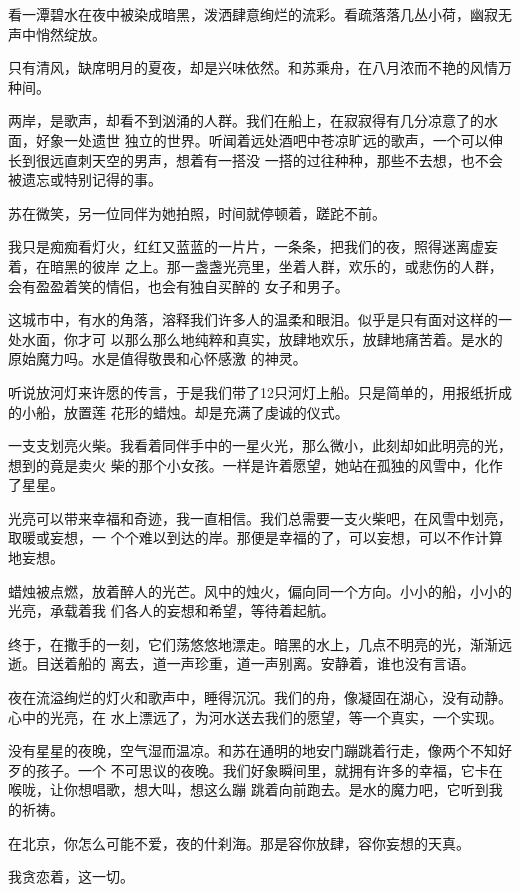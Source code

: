 		看一潭碧水在夜中被染成暗黑，泼洒肆意绚烂的流彩。看疏落落几丛小荷，幽寂无声中悄然绽放。

		只有清风，缺席明月的夏夜，却是兴味依然。和苏乘舟，在八月浓而不艳的风情万种间。

		两岸，是歌声，却看不到汹涌的人群。我们在船上，在寂寂得有几分凉意了的水面，好象一处遗世
	独立的世界。听闻着远处酒吧中苍凉旷远的歌声，一个可以伸长到很远直刺天空的男声，想着有一搭没
	一搭的过往种种，那些不去想，也不会被遗忘或特别记得的事。

		苏在微笑，另一位同伴为她拍照，时间就停顿着，蹉跎不前。

		我只是痴痴看灯火，红红又蓝蓝的一片片，一条条，把我们的夜，照得迷离虚妄着，在暗黑的彼岸
	之上。那一盏盏光亮里，坐着人群，欢乐的，或悲伤的人群，会有盈盈着笑的情侣，也会有独自买醉的
	女子和男子。

		这城市中，有水的角落，溶释我们许多人的温柔和眼泪。似乎是只有面对这样的一处水面，你才可
	以那么那么地纯粹和真实，放肆地欢乐，放肆地痛苦着。是水的原始魔力吗。水是值得敬畏和心怀感激
	的神灵。

		听说放河灯来许愿的传言，于是我们带了12只河灯上船。只是简单的，用报纸折成的小船，放置莲
	花形的蜡烛。却是充满了虔诚的仪式。

		一支支划亮火柴。我看着同伴手中的一星火光，那么微小，此刻却如此明亮的光，想到的竟是卖火
	柴的那个小女孩。一样是许着愿望，她站在孤独的风雪中，化作了星星。

		光亮可以带来幸福和奇迹，我一直相信。我们总需要一支火柴吧，在风雪中划亮，取暖或妄想，一
	个个难以到达的岸。那便是幸福的了，可以妄想，可以不作计算地妄想。

		蜡烛被点燃，放着醉人的光芒。风中的烛火，偏向同一个方向。小小的船，小小的光亮，承载着我
	们各人的妄想和希望，等待着起航。

		终于，在撒手的一刻，它们荡悠悠地漂走。暗黑的水上，几点不明亮的光，渐渐远逝。目送着船的
	离去，道一声珍重，道一声别离。安静着，谁也没有言语。

		夜在流溢绚烂的灯火和歌声中，睡得沉沉。我们的舟，像凝固在湖心，没有动静。心中的光亮，在
	水上漂远了，为河水送去我们的愿望，等一个真实，一个实现。

		没有星星的夜晚，空气湿而温凉。和苏在通明的地安门蹦跳着行走，像两个不知好歹的孩子。一个
	不可思议的夜晚。我们好象瞬间里，就拥有许多的幸福，它卡在喉咙，让你想唱歌，想大叫，想这么蹦
	跳着向前跑去。是水的魔力吧，它听到我的祈祷。

		在北京，你怎么可能不爱，夜的什刹海。那是容你放肆，容你妄想的天真。

		我贪恋着，这一切。

